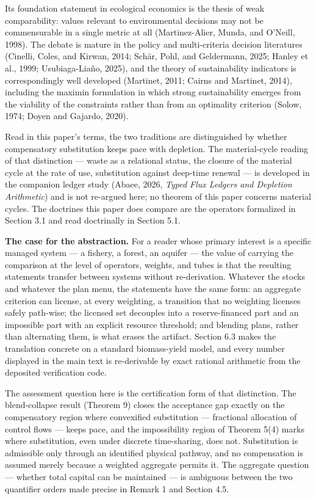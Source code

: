 \documentclass[3p,11pt]{elsarticle}
\begin{document}
Its foundation statement in ecological
economics is the thesis of weak comparability: values relevant to
environmental decisions may not be commensurable in a single metric at
all (Martinez-Alier, Munda, and O'Neill, 1998). The debate is mature in
the policy and multi-criteria decision literatures (Cinelli, Coles, and
Kirwan, 2014; Sch\"ar, Pohl, and Geldermann, 2025; Hanley et al., 1999;
Usubiaga-Lia\~no, 2025), and the theory of sustainability indicators is
correspondingly well developed (Martinet, 2011; Cairns and Martinet,
2014), including the maximin formulation in which strong sustainability
emerges from the viability of the constraints rather than from an
optimality criterion (Solow, 1974; Doyen and Gajardo, 2020).

Read in this paper's terms, the two traditions are distinguished by
whether compensatory substitution keeps pace with depletion. The
material-cycle reading of that distinction --- waste as a relational
status, the closure of the material cycle at the rate of use,
substitution against deep-time renewal --- is developed in the companion ledger study (Abaee, 2026, \emph{Typed Flux Ledgers and Depletion Arithmetic}) and is not re-argued here; no theorem of this paper concerns material cycles. The
doctrines this paper does compare are the operators formalized in
Section 3.1 and read doctrinally in Section 5.1.

\medskip

\noindent\textbf{The case for the abstraction.} For a reader whose
primary interest is a specific managed system --- a fishery, a forest, an
aquifer --- the value of carrying the comparison at the level of operators,
weights, and tubes is that the resulting statements transfer between systems
without re-derivation. Whatever the stocks and whatever the plan menu, the
statements have the same form: an aggregate criterion can license, at every
weighting, a transition that no weighting licenses safely path-wise; the
licensed set decouples into a reserve-financed part and an impossible part
with an explicit resource threshold; and blending plans, rather than
alternating them, is what erases the artifact. Section 6.3 makes the
translation concrete on a standard biomass-yield model, and every number
displayed in the main text is re-derivable by exact rational arithmetic from
the deposited verification code.

The assessment question here is the certification form of that
distinction. The blend-collapse result (Theorem 9) closes the acceptance
gap exactly on the compensatory region where convexified substitution
--- fractional allocation of control flows --- keeps pace, and the
impossibility region of Theorem 5(4) marks where substitution, even
under discrete time-sharing, does not. Substitution is admissible only
through an identified physical pathway, and no compensation is assumed
merely because a weighted aggregate permits it. The aggregate question --- whether total capital can be maintained --- is ambiguous between the two quantifier orders made precise in Remark 1 and Section 4.5.
\end{document}
